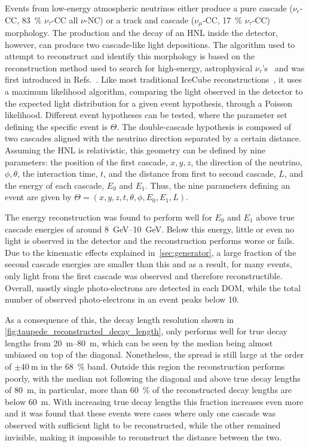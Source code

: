 \documentclass[
    aps,
    prd,
    reprint,
    amsmath,
    amssymb,
    nofootinbib,
    linenumbers,
    superscriptaddress,
    floatfix
]{revtex4-2}
\newcommand{\gev}{\giga\electronvolt}
\begin{document}
Events from low-energy atmospheric neutrinos either produce a pure cascade ($\nu_{e}$-CC, \SI{83}{\percent} $\nu_{\tau}$-CC all $\nu$-NC) or a track and cascade ($\nu_{\mu}$-CC, \SI{17}{\percent} $\nu_{\tau}$-CC) morphology. The production and the decay of an HNL inside the detector, however, can produce two cascade-like light depositions. The algorithm used to attempt to reconstruct and identify this morphology is based on the reconstruction method used to search for high-energy, astrophysical $\nu_{\tau}$'s~\cite{Abbasi:2020zmr} and was first introduced in Refs.~\cite{PHallen, MUsner}. Like most traditional IceCube reconstructions~\cite{IceCube:2013dkx,IceCube:2024csv}, it uses a maximum likelihood algorithm, comparing the light observed in the detector to the expected light distribution for a given event hypothesis, through a Poisson likelihood. Different event hypotheses can be tested, where the parameter set defining the specific event is $\Theta$. The double-cascade hypothesis is composed of two cascades aligned with the neutrino direction separated by a certain distance. Assuming the HNL is relativistic, this geometry can be defined by nine parameters: the position of the first cascade, $x, y, z$, the direction of the neutrino, $\phi, \theta$, the interaction time, $t$, and the distance from first to second cascade, $L$, and the energy of each cascade, $E_0$ and $E_1$. Thus, the nine parameters defining an event are given by $\Theta = (x, y, z, t, \theta, \phi, E_0, E_1, L)$.

The energy reconstruction was found to perform well for $E_0$ and $E_1$ above true cascade energies of around \SIrange{8}{10}{\gev}. Below this energy, little or even no light is observed in the detector and the reconstruction performs worse or fails. Due to the kinematic effects explained in~\cref{sec:generator}, a large fraction of the second cascade energies are smaller than this and as a result, for many events, only light from the first cascade was observed and therefore reconstructible. Overall, mostly single photo-electrons are detected in each DOM, while the total number of observed photo-electrons in an event peaks below 10.

As a consequence of this, the decay length resolution shown in \cref{fig:taupede_reconstructed_decay_length}, only performs well for true decay lengths from \SIrange{20}{80}{\meter}, which can be seen by the median being almost unbiased on top of the diagonal. Nonetheless, the spread is still large at the order of $\pm \SI{40}{\meter}$ in the \SI{68}{\percent} band. Outside this region the reconstruction performs poorly, with the median not following the diagonal and above true decay lengths of \SI{80}{\meter}, in particular, more than \SI{60}{\percent} of the reconstructed decay lengths are below \SI{60}{\meter}. With increasing true decay lengths this fraction increases even more and it was found that these events were cases where only one cascade was observed with sufficient light to be reconstructed, while the other remained invisible, making it impossible to reconstruct the distance between the two.
\end{document}
